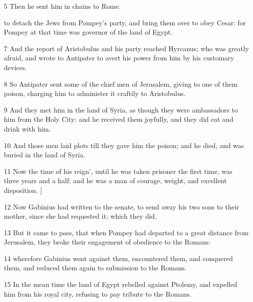\par 5 Then he sent him in chains to Rome. 

\par [And he remained shut up in prison until the reign of Caesar; who brought him out of prison, and loaded him with gifts and favours; 

\par 6 and giving to him two generals and twelve thousand men, sent him into the land of Judah, [B.C. 49.] to detach the Jews from Pompey’s party, and bring them over to obey Cesar: for Pompey at that time was governor of the land of Egypt. 

\par 7 And the report of Aristobulus and his party reached Hyrcanus; who was greatly afraid, and wrote to Antipater to avert his power from him by his customary devices. 

\par 8 So Antipater sent some of the chief men of Jerusalem, giving to one of them poison, charging him to administer it craftily to Aristobulus. 

\par 9 And they met him in the land of Syria, as though they were ambassadors to him from the Holy City: and he received them joyfully, and they did eat and drink with him. 

\par 10 And those men laid plots till they gave him the poison; and he died, and was buried in the land of Syria. 

\par 11 Now the time of his reign’, until he was taken prisoner the first time, was three years and a half; and he was a man of courage, weight, and excellent disposition. ] 

\par 12 Now Gabinius had written to the senate, to send away his two sons to their mother, since she had requested it; which they did. 

\par 13 But it came to pass, that when Pompey had departed to a great distance from Jerusalem, they broke their engagement of obedience to the Romans: 

\par 14 wherefore Gabinius went against them, encountered them, and conquered them, and reduced them again to submission to the Romans. 

\par 15 In the mean time the land of Egypt rebelled against Ptolemy, and expelled him from his royal city, refusing to pay tribute to the Romans. 


